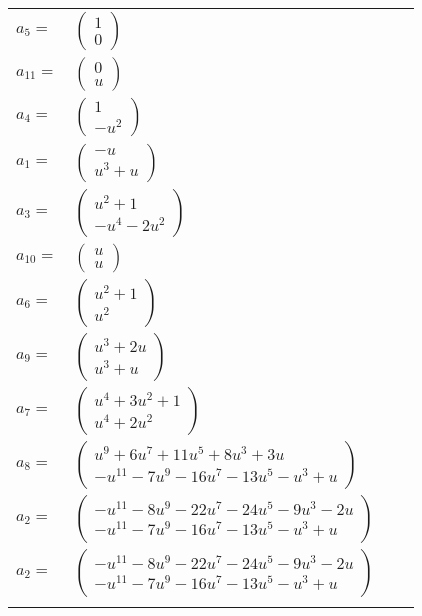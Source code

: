 \documentclass[1p]{elsarticle_modified}
\theoremstyle{definition}
\begin{document}
\begin{tabular}{m{7pt} m{180pt} m{7pt} m{180pt} }
\flushright $a_{5}=$&$\begin{pmatrix}1\\0\end{pmatrix}$ \\
\flushright $a_{11}=$&$\begin{pmatrix}0\\u\end{pmatrix}$ \\
\flushright $a_{4}=$&$\begin{pmatrix}1\\- u^2\end{pmatrix}$ \\
\flushright $a_{1}=$&$\begin{pmatrix}- u\\u^3+u\end{pmatrix}$ \\
\flushright $a_{3}=$&$\begin{pmatrix}u^2+1\\- u^4-2 u^2\end{pmatrix}$ \\
\flushright $a_{10}=$&$\begin{pmatrix}u\\u\end{pmatrix}$ \\
\flushright $a_{6}=$&$\begin{pmatrix}u^2+1\\u^2\end{pmatrix}$ \\
\flushright $a_{9}=$&$\begin{pmatrix}u^3+2 u\\u^3+u\end{pmatrix}$ \\
\flushright $a_{7}=$&$\begin{pmatrix}u^4+3 u^2+1\\u^4+2 u^2\end{pmatrix}$ \\
\flushright $a_{8}=$&$\begin{pmatrix}u^9+6 u^7+11 u^5+8 u^3+3 u\\- u^{11}-7 u^9-16 u^7-13 u^5- u^3+u\end{pmatrix}$ \\
\flushright $a_{2}=$&$\begin{pmatrix}- u^{11}-8 u^9-22 u^7-24 u^5-9 u^3-2 u\\- u^{11}-7 u^9-16 u^7-13 u^5- u^3+u\end{pmatrix}$\\ \flushright $a_{2}=$&$\begin{pmatrix}- u^{11}-8 u^9-22 u^7-24 u^5-9 u^3-2 u\\- u^{11}-7 u^9-16 u^7-13 u^5- u^3+u\end{pmatrix}$\\&\end{tabular}
\end{document}
